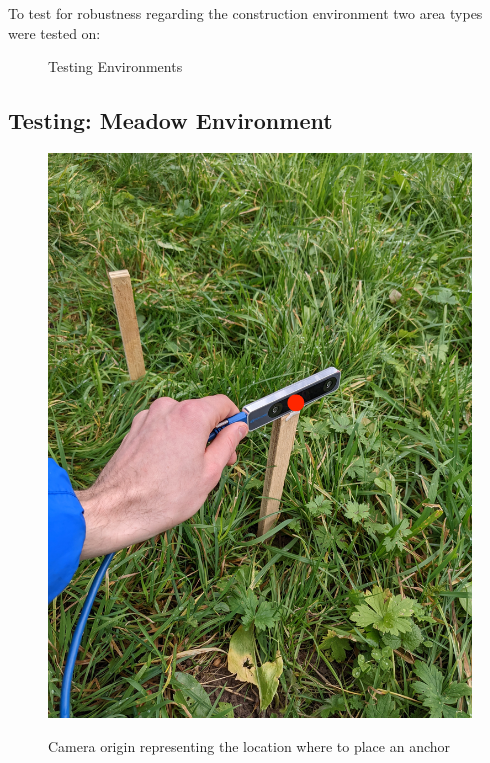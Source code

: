 To test for robustness regarding the construction environment two area types were tested on:

\begin{figure}[htp]
    \centering
        \hfill
        \hfill
    \caption{Testing Environments}
    \label{fig:environments}
\end{figure}
\clearpage


\subsection*{Testing: Meadow Environment}\label{subsec:meadow}


\begin{figure}[ht]
    \centering
    \includegraphics[scale = 0.1]{images/colocalization/meadow_start.jpg}
    \label{fig:meadow_start}
    \caption{Camera origin representing the location where to place an anchor}
\end{figure}
\clearpage

